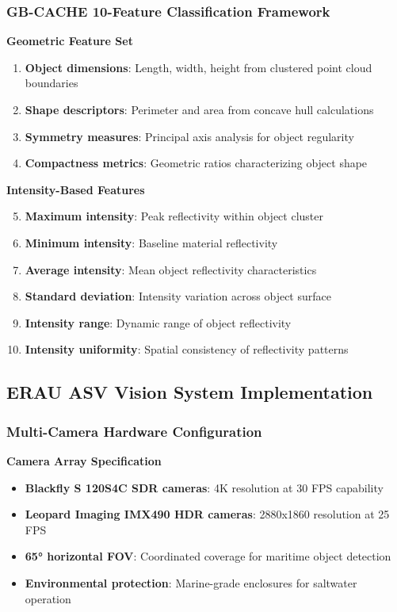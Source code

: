 \documentclass{erauthesis}
\begin{document}
\subsubsection{GB-CACHE 10-Feature Classification Framework}

\textbf{Geometric Feature Set}
\begin{enumerate}
\item \textbf{Object dimensions}: Length, width, height from clustered point cloud boundaries
\item \textbf{Shape descriptors}: Perimeter and area from concave hull calculations
\item \textbf{Symmetry measures}: Principal axis analysis for object regularity
\item \textbf{Compactness metrics}: Geometric ratios characterizing object shape
\end{enumerate}

\textbf{Intensity-Based Features}
\begin{enumerate}
\setcounter{enumi}{4}
\item \textbf{Maximum intensity}: Peak reflectivity within object cluster
\item \textbf{Minimum intensity}: Baseline material reflectivity
\item \textbf{Average intensity}: Mean object reflectivity characteristics
\item \textbf{Standard deviation}: Intensity variation across object surface
\item \textbf{Intensity range}: Dynamic range of object reflectivity
\item \textbf{Intensity uniformity}: Spatial consistency of reflectivity patterns
\end{enumerate}

\subsection{ERAU ASV Vision System Implementation}

\subsubsection{Multi-Camera Hardware Configuration}

\textbf{Camera Array Specification}
\begin{itemize}
\item \textbf{Blackfly S 120S4C SDR cameras}: 4K resolution at 30 FPS capability
\item \textbf{Leopard Imaging IMX490 HDR cameras}: 2880x1860 resolution at 25 FPS
\item \textbf{65° horizontal FOV}: Coordinated coverage for maritime object detection
\item \textbf{Environmental protection}: Marine-grade enclosures for saltwater operation
\end{itemize}
\end{document}
